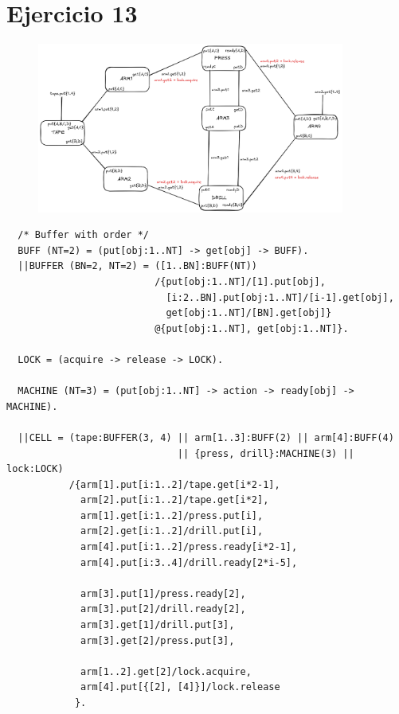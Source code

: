 \documentclass{article}
\begin{document}
\section*{Ejercicio 13}
\begin{figure}[ht]
	\includegraphics[width=0.9\textwidth]{01-13.png}
	\centering
\end{figure}
\begin{verbatim}
  /* Buffer with order */
  BUFF (NT=2) = (put[obj:1..NT] -> get[obj] -> BUFF).
  ||BUFFER (BN=2, NT=2) = ([1..BN]:BUFF(NT))
                          /{put[obj:1..NT]/[1].put[obj],
                            [i:2..BN].put[obj:1..NT]/[i-1].get[obj],
                            get[obj:1..NT]/[BN].get[obj]}
                          @{put[obj:1..NT], get[obj:1..NT]}.

  LOCK = (acquire -> release -> LOCK).

  MACHINE (NT=3) = (put[obj:1..NT] -> action -> ready[obj] -> MACHINE).

  ||CELL = (tape:BUFFER(3, 4) || arm[1..3]:BUFF(2) || arm[4]:BUFF(4)
                              || {press, drill}:MACHINE(3) || lock:LOCK)
           /{arm[1].put[i:1..2]/tape.get[i*2-1],
             arm[2].put[i:1..2]/tape.get[i*2],
             arm[1].get[i:1..2]/press.put[i],
             arm[2].get[i:1..2]/drill.put[i],
             arm[4].put[i:1..2]/press.ready[i*2-1],
             arm[4].put[i:3..4]/drill.ready[2*i-5],
             
             arm[3].put[1]/press.ready[2],
             arm[3].put[2]/drill.ready[2],
             arm[3].get[1]/drill.put[3],
             arm[3].get[2]/press.put[3],

             arm[1..2].get[2]/lock.acquire,
             arm[4].put[{[2], [4]}]/lock.release
            }.
\end{verbatim}
\end{document}
